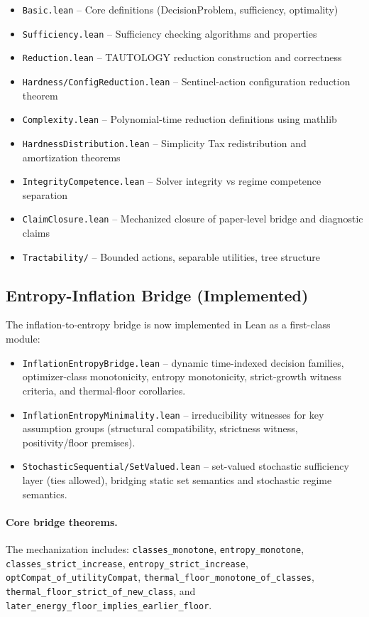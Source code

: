 \begin{itemize}
\item \texttt{Basic.lean} -- Core definitions (DecisionProblem, sufficiency, optimality)
\item \texttt{Sufficiency.lean} -- Sufficiency checking algorithms and properties
\item \texttt{Reduction.lean} -- TAUTOLOGY reduction construction and correctness
\item \texttt{Hardness/ConfigReduction.lean} -- Sentinel-action configuration reduction theorem
\item \texttt{Complexity.lean} -- Polynomial-time reduction definitions using mathlib
\item \texttt{HardnessDistribution.lean} -- Simplicity Tax redistribution and amortization theorems
\item \texttt{IntegrityCompetence.lean} -- Solver integrity vs regime competence separation
\item \texttt{ClaimClosure.lean} -- Mechanized closure of paper-level bridge and diagnostic claims
\item \texttt{Tractability/} -- Bounded actions, separable utilities, tree structure
\end{itemize}

\subsection{Entropy-Inflation Bridge (Implemented)}

The inflation-to-entropy bridge is now implemented in Lean as a first-class module:

\begin{itemize}
\item \texttt{InflationEntropyBridge.lean} -- dynamic time-indexed decision families, optimizer-class monotonicity, entropy monotonicity, strict-growth witness criteria, and thermal-floor corollaries.
\item \texttt{InflationEntropyMinimality.lean} -- irreducibility witnesses for key assumption groups (structural compatibility, strictness witness, positivity/floor premises).
\item \texttt{StochasticSequential/SetValued.lean} -- set-valued stochastic sufficiency layer (ties allowed), bridging static set semantics and stochastic regime semantics.
\end{itemize}

\paragraph{Core bridge theorems.}
The mechanization includes:
\texttt{classes\_monotone}, \texttt{entropy\_monotone},
\texttt{classes\_strict\_increase}, \texttt{entropy\_strict\_increase},
\texttt{optCompat\_of\_utilityCompat},
\texttt{thermal\_floor\_monotone\_of\_classes},
\texttt{thermal\_floor\_strict\_of\_new\_class}, and
\texttt{later\_energy\_floor\_implies\_earlier\_floor}.

